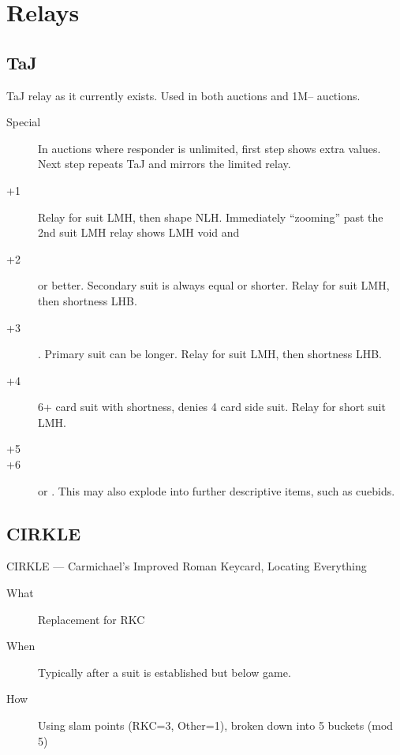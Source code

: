 \documentclass[tom-ari]{subfile}
\begin{document}
\section{Relays}

\subsection{TaJ}
TaJ relay as it currently exists.  Used in both  auctions and 1M-- auctions.

\begin{description}
	\item[Special] In auctions where responder is unlimited, first step shows extra values.  Next step repeats TaJ and mirrors the limited relay.
	\item[+1]  Relay for \second suit LMH, then shape NLH.  Immediately ``zooming'' past the 2nd suit LMH relay shows LMH void and 
	\item[+2]  or better.  Secondary suit is always equal or shorter.  Relay for \second suit LMH, then shortness LHB.
	\item[+3] .  Primary suit can be longer.  Relay for \second suit LMH, then shortness LHB.
	\item[+4] 6+ card suit with shortness, denies 4 card side suit.  Relay for short suit LMH.
	\item[+5] 
	\item[+6]  or .  This may also explode into further descriptive items, such as cuebids.   
\end{description}

\subsection{CIRKLE}

CIRKLE --- Carmichael's Improved Roman Keycard, Locating Everything

\normalsize


\begin{description}
	\item[What] Replacement for RKC
	\item[When] Typically after a suit is established but below game.
	\item[How] Using slam points (RKC=3, Other=1), broken down into 5 buckets (mod 5) 
\end{description}
\end{document}

